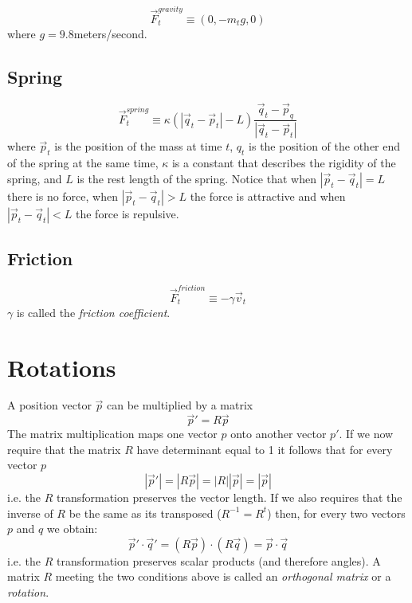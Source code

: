 \documentclass[12pt]{article}
\begin{document}
\begin{equation}
\vec F_t^{gravity} \equiv (0, -m_t g, 0) 
\end{equation}
where $g = 9.8$meters/second.

\subsection{Spring}

\begin{equation}
  \vec F_t^{spring} \equiv \kappa (|\vec q_t - \vec p_t|-L) \frac{\vec q_t-\vec p_q}{|\vec q_t-\vec p_t|}
\end{equation}
where $\vec p_t$ is the position of the mass at time $t$, $q_t$ is the position of the other end of the spring at the same time, $\kappa$ is a constant that describes the rigidity of the spring, and $L$ is the rest length of the spring. Notice that when $|\vec p_t - \vec q_t|=L$ there is no force, when $|\vec p_t - \vec q_t|>L$ the force is attractive and when $|\vec p_t - \vec q_t|<L$ the force is repulsive. 

\subsection{Friction}

\begin{equation}
  \vec F_t^{friction} \equiv - \gamma \vec v_t
\end{equation}
$\gamma$ is called the {\it friction coefficient}.

\section{Rotations}

A position vector $\vec p$ can be multiplied by a matrix
\begin{equation}
\vec p' = R \vec p
\end{equation}
The matrix multiplication maps one vector $p$ onto another vector $p'$. If we now require that the matrix $R$ have determinant equal to 1 it follows that for every vector $p$
\begin{equation}
|\vec p'| = |R\vec p| = |R||\vec p| = |\vec p|
\end{equation}
i.e. the $R$ transformation preserves the vector length. If we also requires that the inverse of $R$ be the same as its transposed ($R^{-1}=R^t$) then, for every two vectors $p$ and $q$ we obtain:
\begin{equation}
\vec p' \cdot \vec q' = (R\vec p)\cdot(R\vec q) = \vec p \cdot \vec q
\end{equation}
i.e. the $R$ transformation preserves scalar products (and therefore angles).
A matrix $R$ meeting the two conditions above is called an {\it orthogonal matrix} or a {\it rotation}.
\end{document}
